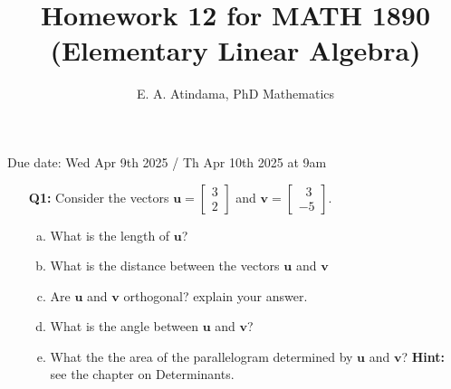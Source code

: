 \documentclass[a4paper,11pt,reqno]{amsart}
\title[MATH 1890 (Elementary Linear Algebra)]{Homework 12 for MATH 1890 (Elementary Linear Algebra)}
\author[Emmanuel Atindama]{E. A. Atindama, PhD Mathematics}
\numberwithin{equation}{section}
\begin{document}
\maketitle
Due date: Wed Apr 9th 2025 / Th Apr 10th 2025 at 9am
\vspace{0.5cm}

\begin{enumerate}
    \item[\textbf{Q1:}] Consider  the vectors \(\mathbf{u} =\begin{bmatrix} 3 \\ 2 \end{bmatrix}\) and 
    \(\mathbf{v} =\begin{bmatrix} \;\;3 \\ -5 \end{bmatrix}\).
    \vspace{0.25cm}
    
    \begin{enumerate}[a)]
        \item What is the length of \(\mathbf{u}\)?
        \item What is the distance between the vectors \(\mathbf{u}\) and \(\mathbf{v}\)
        \item Are \(\mathbf{u}\) and \(\mathbf{v}\) orthogonal? explain your answer.
        \item What is the angle between \(\mathbf{u}\) and \(\mathbf{v}\)?
        \item What the the area of the parallelogram determined by \(\mathbf{u}\) and \(\mathbf{v}\)? 
        \textbf{Hint: }see the chapter on Determinants.
    \end{enumerate}
    \vspace{0.3cm}
    
    \begin{center}\setlength{\fboxsep}{10pt}
\end{center}
\end{enumerate}
\end{document}
